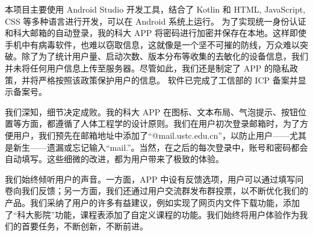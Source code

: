 本项目主要使用 Android Studio 开发工具，结合了 Kotlin 和 HTML, JavaScript, CSS 等多种语言进行开发，可以在 Android 系统上运行。
为了实现统一身份认证和科大邮箱的自动登录，我的科大 APP 将密码进行加密并保存在本地。这样即使手机中有病毒软件，也难以窃取信息，这就像是一个坚不可摧的防线，万众难以突破。除了为了统计用户量、启动次数、版本分布等收集的去敏化的设备信息，我们并未将任何用户信息上传至服务器。尽管如此，我们还是制定了 APP 的隐私政策，并将严格按照该政策保护用户的信息。
软件已完成了工信部的 ICP 备案并显示备案号。

我们深知，细节决定成败。我的科大 APP 在图标、文本布局、气泡提示、按钮位置等方面，都遵循了人体工程学的设计原则。我们在用户初次登录邮箱时，为了方便用户，我们预先在邮箱地址中添加了“@mail.ustc.edu.cn”，以防止用户——尤其是新生——遗漏或忘记输入“mail.”。当然，在之后的每次登录中，账号和密码都会自动填写。这些细微的改进，都为用户带来了极致的体验。

我们始终倾听用户的声音。一方面，APP 中设有反馈选项，用户可以通过填写问卷向我们反馈；另一方面，我们还通过用户交流群发布群投票，以不断优化我们的产品。我们采纳了用户的许多有益建议，例如实现了网页内文件下载功能，添加了“科大影院”功能，课程表添加了自定义课程的功能。我们始终将用户体验作为我们的首要任务，不断创新，不断前进。
